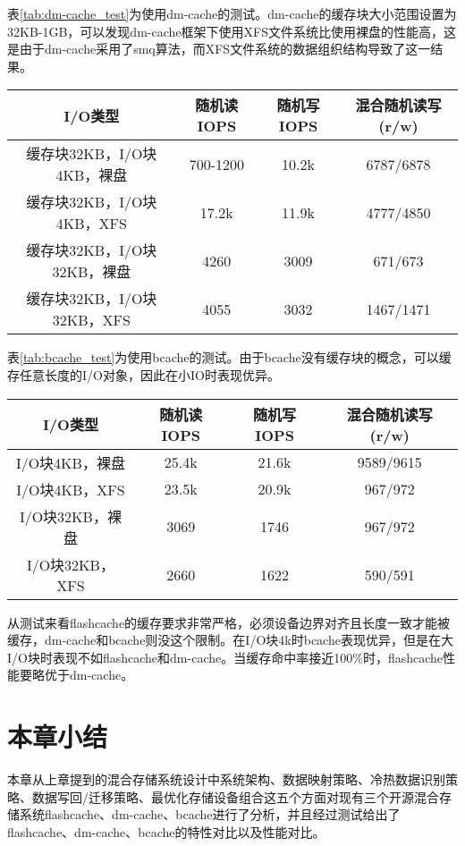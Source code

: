 表\ref{tab:dm-cache_test}为使用dm-cache的测试。dm-cache的缓存块大小范围设置为32KB-1GB，可以发现dm-cache框架下使用XFS文件系统比使用裸盘的性能高，这是由于dm-cache采用了smq算法，而XFS文件系统的数据组织结构导致了这一结果。 

\begin{table}[!hpb]
    \centering
    \begin{tabular}{cccc} 
      \toprule
      I/O类型 & 随机读IOPS & 随机写IOPS & 混合随机读写(r/w) \\ 
      \midrule
      缓存块32KB，I/O块4KB，裸盘 & 700-1200 & 10.2k & 6787/6878 \\
      缓存块32KB，I/O块4KB，XFS & 17.2k & 11.9k & 4777/4850 \\
      缓存块32KB，I/O块32KB，裸盘 & 4260 & 3009 & 671/673 \\
      缓存块32KB，I/O块32KB，XFS & 4055 & 3032 & 1467/1471 \\
      \bottomrule
    \end{tabular}
\end{table}

表\ref{tab:bcache_test}为使用bcache的测试。由于bcache没有缓存块的概念，可以缓存任意长度的I/O对象，因此在小IO时表现优异。

\begin{table}[!hpb]
    \centering
    \begin{tabular}{cccc} 
      \toprule
      I/O类型 & 随机读IOPS & 随机写IOPS & 混合随机读写(r/w) \\ 
      \midrule
      I/O块4KB，裸盘 & 25.4k & 21.6k & 9589/9615 \\
      I/O块4KB，XFS & 23.5k & 20.9k & 967/972 \\
      I/O块32KB，裸盘 & 3069 & 1746 & 967/972 \\
      I/O块32KB，XFS & 2660 & 1622 & 590/591 \\
      \bottomrule
    \end{tabular}
\end{table}

从测试来看flashcache的缓存要求非常严格，必须设备边界对齐且长度一致才能被缓存，dm-cache和bcache则没这个限制。在I/O块4k时bcache表现优异，但是在大I/O块时表现不如flashcache和dm-cache。当缓存命中率接近100\%时，flashcache性能要略优于dm-cache。

\section{本章小结}

本章从上章提到的混合存储系统设计中系统架构、数据映射策略、冷热数据识别策略、数据写回/迁移策略、最优化存储设备组合这五个方面对现有三个开源混合存储系统flashcache、dm-cache、bcache进行了分析，并且经过测试给出了flashcache、dm-cache、bcache的特性对比以及性能对比。